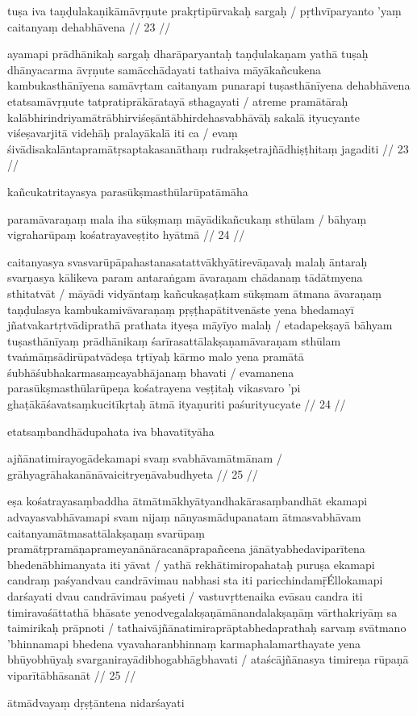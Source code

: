 tuṣa iva taṇḍulakaṇikāmāvṛṇute prakṛtipūrvakaḥ sargaḥ  /
pṛthvīparyanto 'yaṃ caitanyaṃ dehabhāvena  // 23  //

ayamapi prādhānikaḥ sargaḥ dharāparyantaḥ taṇḍulakaṇam yathā tuṣaḥ dhānyacarma āvṛṇute samācchādayati tathaiva māyākañcukena kambukasthānīyena samāvṛtam caitanyam punarapi tuṣasthānīyena dehabhāvena etatsamāvṛṇute tatpratiprākāratayā sthagayati  / atreme pramātāraḥ kalābhirindriyamātrābhirviśeṣāntābhirdehasvabhāvāḥ sakalā ityucyante viśeṣavarjitā videhāḥ pralayākalā iti ca  / evaṃ śivādisakalāntapramātṛsaptakasanāthaṃ rudrakṣetrajñādhiṣṭhitaṃ jagaditi  // 23  //

kañcukatritayasya parasūkṣmasthūlarūpatāmāha

paramāvaraṇaṃ mala iha sūkṣmaṃ māyādikañcukaṃ sthūlam  /
bāhyaṃ vigraharūpaṃ kośatrayaveṣṭito hyātmā  // 24  //

caitanyasya svasvarūpāpahastanasatattvākhyātirevāṇavaḥ malaḥ āntaraḥ svarṇasya kālikeva param antaraṅgam āvaraṇam chādanaṃ tādātmyena sthitatvāt  / māyādi vidyāntaṃ kañcukaṣaṭkam sūkṣmam ātmana āvaraṇaṃ taṇḍulasya kambukamivāvaraṇaṃ pṛṣṭhapātitvenāste yena bhedamayī jñatvakartṛtvādiprathā prathata ityeṣa māyīyo malaḥ  / etadapekṣayā bāhyam tuṣasthānīyaṃ prādhānikaṃ śarīrasattālakṣaṇamāvaraṇam sthūlam tvaṅmāṃsādirūpatvādeṣa tṛtīyaḥ kārmo malo yena pramātā śubhāśubhakarmasaṃcayabhājanaṃ bhavati  / evamanena parasūkṣmasthūlarūpeṇa kośatrayena veṣṭitaḥ vikasvaro 'pi ghaṭākāśavatsaṃkucitīkṛtaḥ ātmā ityaṇuriti paśurityucyate  // 24  //

etatsaṃbandhādupahata iva bhavatītyāha

ajñānatimirayogādekamapi svaṃ svabhāvamātmānam  /
grāhyagrāhakanānāvaicitryeṇāvabudhyeta  // 25  //

eṣa kośatrayasaṃbaddha ātmātmākhyātyandhakārasaṃbandhāt ekamapi advayasvabhāvamapi svam nijaṃ nānyasmādupanatam ātmasvabhāvam caitanyamātmasattālakṣaṇaṃ svarūpaṃ pramātṛpramāṇaprameyanānāracanāprapañcena jānātyabhedaviparītena bhedenābhimanyata iti yāvat  / yathā rekhātimiropahataḥ puruṣa ekamapi candraṃ paśyandvau candrāvimau nabhasi sta iti paricchindamṝÉllokamapi darśayati dvau candrāvimau paśyeti  / vastuvṛttenaika evāsau candra iti timiravaśāttathā bhāsate yenodvegalakṣaṇāmānandalakṣaṇāṃ vārthakriyāṃ sa taimirikaḥ prāpnoti  / tathaivājñānatimiraprāptabhedaprathaḥ sarvaṃ svātmano 'bhinnamapi bhedena vyavaharanbhinnaṃ karmaphalamarthayate yena bhūyobhūyaḥ svarganirayādibhogabhāgbhavati  / ataścājñānasya timireṇa rūpaṇā viparītābhāsanāt  // 25  //

ātmādvayaṃ dṛṣṭāntena nidarśayati

